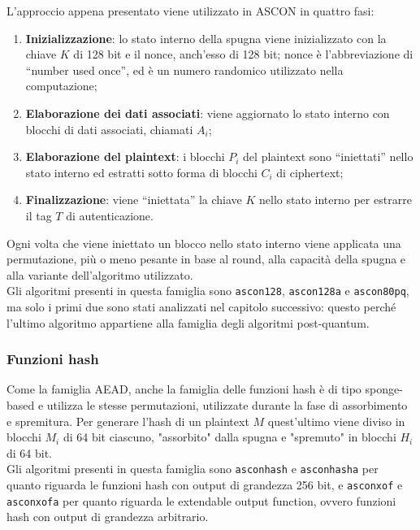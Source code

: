 \noindent L'approccio appena presentato viene utilizzato in ASCON in quattro fasi\cite{ascon-specification}:
\begin{enumerate}
    \item \textbf{Inizializzazione}: lo stato interno della spugna viene inizializzato con la chiave $K$ di 128 bit e il nonce, anch'esso di 128 bit; nonce è l'abbreviazione di ``number used once'', ed è un numero randomico utilizzato nella computazione;
    \item \textbf{Elaborazione dei dati associati}: viene aggiornato lo stato interno con blocchi di dati associati, chiamati $A_i$;
    \item \textbf{Elaborazione del plaintext}: i blocchi $P_i$ del plaintext sono ``iniettati'' nello stato interno ed estratti sotto forma di blocchi $C_i$ di ciphertext;
    \item \textbf{Finalizzazione}: viene ``iniettata'' la chiave $K$ nello stato interno per estrarre il tag $T$ di autenticazione.
\end{enumerate}
\noindent Ogni volta che viene iniettato un blocco nello stato interno viene applicata una permutazione, più o meno pesante in base al round, alla capacità della spugna e alla variante dell'algoritmo utilizzato. \\

\noindent Gli algoritmi presenti in questa famiglia sono \texttt{ascon128}, \texttt{ascon128a} e \texttt{ascon80pq}, ma solo i primi due sono stati analizzati nel capitolo successivo: questo perché l'ultimo algoritmo appartiene alla famiglia degli algoritmi post-quantum.

\subsubsection{Funzioni hash}

Come la famiglia AEAD, anche la famiglia delle funzioni hash è di tipo sponge-based e utilizza le stesse permutazioni, utilizzate durante la fase di assorbimento e spremitura. Per generare l'hash di un plaintext $M$ quest'ultimo viene diviso in blocchi $M_i$ di 64 bit ciascuno, "assorbito" dalla spugna e "spremuto" in blocchi $H_i$ di 64 bit. \\

\noindent Gli algoritmi presenti in questa famiglia sono \texttt{asconhash} e \texttt{asconhasha} per quanto riguarda le funzioni hash con output di grandezza 256 bit, e \texttt{asconxof} e \texttt{asconxofa} per quanto riguarda le extendable output function, ovvero funzioni hash con output di grandezza arbitrario\cite{ascon-specification}.

